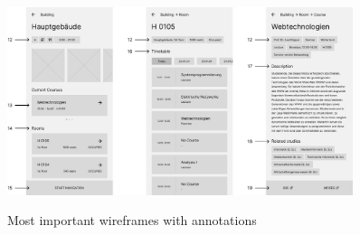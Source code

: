 \begin{figure}[H]
	\centering
	\includegraphics[width=0.9\textwidth]{images/wireframes_2.png}\\
	\caption{Most important wireframes with annotations}
\end{figure}

